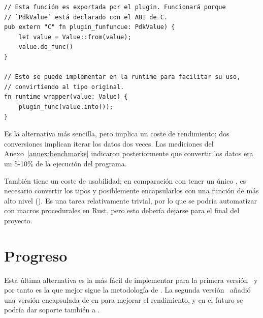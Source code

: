 \begin{verbatim}
// Esta función es exportada por el plugin. Funcionará porque
// `PdkValue` está declarado con el ABI de C.
pub extern "C" fn plugin_funfuncue: PdkValue) {
    let value = Value::from(value);
    value.do_func()
}

// Esto se puede implementar en la runtime para facilitar su uso,
// convirtiendo al tipo original.
fn runtime_wrapper(value: Value) {
    plugin_func(value.into());
}
\end{verbatim}

Es la alternativa más sencilla, pero implica un coste de rendimiento; dos
conversiones implican iterar los datos dos veces. Las mediciones del
Anexo~\ref{annex:benchmarks} indicaron posteriormente que convertir los datos
era un 5-10\% de la ejecución del programa.

También tiene un coste de usabilidad; en comparación con tener un único
, es necesario convertir los tipos y posiblemente encapsularlos con
una función de más alto nivel (). Es una tarea
relativamente trivial, por lo que se podría automatizar con macros procedurales
en Rust, pero esto debería dejarse para el final del proyecto.

\section{Progreso}

Esta última alternativa es la más fácil de implementar para la primera
versión~\cite{pdk_v1} y por tanto es la que mejor sigue la metodología de \work.
La segunda versión~\cite{pdk_v2} añadió una versión encapsulada de
 en \abistable para mejorar el rendimiento, y en el futuro se
podría dar soporte también a .
